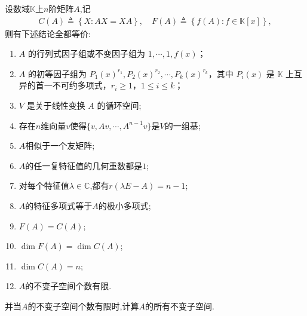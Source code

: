 \documentclass[../../main.tex]{subfiles}%
\begin{document}
\begin{theorem}[F(A)=C(A)的充要条件和不变子空间刻画]\label{theorem:F(A)=C(A)的充要条件和不变子空间刻画}
设数域$\mathbb{K}$上$n$阶矩阵$A$,记
\begin{align*}
C\left( A \right) \triangleq \left\{ X:AX=XA \right\},\quad
F\left( A \right) \triangleq \left\{ f\left( A \right) :f\in \mathbb{K} \left[ x \right] \right\},
\end{align*}
则有下述结论全都等价:
\begin{enumerate}[(1)]
\item\label{theorem:F(A)=C(A)的充要条件和不变子空间刻画-10} \(A\) 的行列式因子组或不变因子组为 \(1,\cdots,1,f(x)\)；

\item\label{theorem:F(A)=C(A)的充要条件和不变子空间刻画-11} \(A\) 的初等因子组为 \(P_1(x)^{r_1},P_2(x)^{r_2},\cdots,P_k(x)^{r_k}\)，其中 \(P_i(x)\) 是 \(\mathbb{K}\) 上互异的首一不可约多项式，\(r_i\geqslant 1\)，\(1\leqslant  i\leqslant  k\)； 

\item\label{theorem:F(A)=C(A)的充要条件和不变子空间刻画-12} \(V\) 是关于线性变换 \(A\) 的循环空间;

\item\label{theorem:F(A)=C(A)的充要条件和不变子空间刻画-1} 存在$n$维向量$v$使得$\{v,Av,\cdots,A^{n-1}v\}$是$V$的一组基;

\item\label{theorem:F(A)=C(A)的充要条件和不变子空间刻画-2} $A$相似于一个友矩阵;

\item\label{theorem:F(A)=C(A)的充要条件和不变子空间刻画-6} $A$的任一复特征值的几何重数都是$1$;

\item\label{theorem:F(A)=C(A)的充要条件和不变子空间刻画-7} 对每个特征值$\lambda\in\mathbb{C}$,都有$r(\lambda E-A)=n-1$;

\item\label{theorem:F(A)=C(A)的充要条件和不变子空间刻画-8} $A$的特征多项式等于$A$的极小多项式;

\item\label{theorem:F(A)=C(A)的充要条件和不变子空间刻画-3}$F(A)=C(A)$;

\item\label{theorem:F(A)=C(A)的充要条件和不变子空间刻画-4}  $\dim F(A)=\dim C(A)$;

\item\label{theorem:F(A)=C(A)的充要条件和不变子空间刻画-5} $\dim C(A)=n$;

\item\label{theorem:F(A)=C(A)的充要条件和不变子空间刻画-9}$A$的不变子空间个数有限.
\end{enumerate}
并当$A$的不变子空间个数有限时,计算$A$的所有不变子空间.
\end{theorem}
\end{document}
